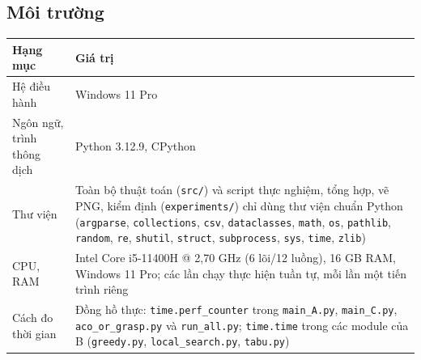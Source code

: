 \documentclass[a4paper,12pt]{article}
\begin{document}
\subsection{Môi trường}
\begin{center}
\begin{tabularx}{\textwidth}{lY}
\toprule
Hạng mục & Giá trị\\
\midrule
Hệ điều hành & Windows 11 Pro\\
Ngôn ngữ, trình thông dịch & Python 3.12.9, CPython\\
Thư viện & Toàn bộ thuật toán (\texttt{src/}) và script thực nghiệm, tổng hợp, vẽ PNG, kiểm định (\texttt{experiments/}) chỉ dùng thư viện chuẩn Python (\texttt{argparse}, \texttt{collections}, \texttt{csv}, \texttt{dataclasses}, \texttt{math}, \texttt{os}, \texttt{pathlib}, \texttt{random}, \texttt{re}, \texttt{shutil}, \texttt{struct}, \texttt{subprocess}, \texttt{sys}, \texttt{time}, \texttt{zlib})\\
CPU, RAM & Intel Core i5-11400H @ 2,70 GHz (6 lõi/12 luồng), 16 GB RAM, Windows 11 Pro; các lần chạy thực hiện tuần tự, mỗi lần một tiến trình riêng\\
Cách đo thời gian & Đồng hồ thực: \texttt{time.perf\_counter} trong \texttt{main\_A.py}, \texttt{main\_C.py}, \texttt{aco\_or\_grasp.py} và \texttt{run\_all.py}; \texttt{time.time} trong các module của B (\texttt{greedy.py}, \texttt{local\_search.py}, \texttt{tabu.py})\\
\bottomrule
\end{tabularx}
\end{center}
\end{document}
